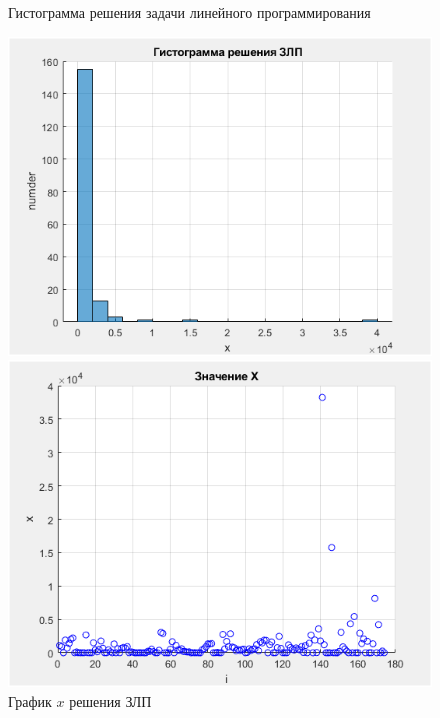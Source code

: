 \documentclass[a4]{article}
\begin{document}
\begin{figure}[H]
\begin{center}
\caption{Гистограмма решения задачи линейного программирования}
\includegraphics{pic1.png} 
\caption{График $x$ решения ЗЛП}
\includegraphics{pic2.png}
\end{center}
\end{figure}
\end{document}
